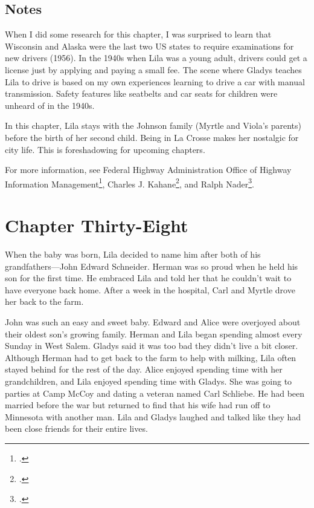 \documentclass[
  letterpaper,
]{book}
\begin{document}
\section{Notes}\label{notes-39}

When I did some research for this chapter, I was surprised to learn that
Wisconsin and Alaska were the last two US states to require examinations
for new drivers (1956). In the 1940s when Lila was a young adult,
drivers could get a license just by applying and paying a small fee. The
scene where Gladys teaches Lila to drive is based on my own experiences
learning to drive a car with manual transmission. Safety features like
seatbelts and car seats for children were unheard of in the 1940s.

In this chapter, Lila stays with the Johnson family (Myrtle and Viola's
parents) before the birth of her second child. Being in La Crosse makes
her nostalgic for city life. This is foreshadowing for upcoming
chapters.

For more information, see Federal Highway Administration Office of
Highway Information Management\footnote{.}, Charles J.
Kahane\footnote{.}, and Ralph Nader\footnote{.}.


\chapter{Chapter Thirty-Eight}\label{chapter-thirty-eight}

When the baby was born, Lila decided to name him after both of his
grandfathers---John Edward Schneider. Herman was so proud when he held
his son for the first time. He embraced Lila and told her that he
couldn't wait to have everyone back home. After a week in the hospital,
Carl and Myrtle drove her back to the farm.

John was such an easy and sweet baby. Edward and Alice were overjoyed
about their oldest son's growing family. Herman and Lila began spending
almost every Sunday in West Salem. Gladys said it was too bad they
didn't live a bit closer. Although Herman had to get back to the farm to
help with milking, Lila often stayed behind for the rest of the day.
Alice enjoyed spending time with her grandchildren, and Lila enjoyed
spending time with Gladys. She was going to parties at Camp McCoy and
dating a veteran named Carl Schliebe. He had been married before the war
but returned to find that his wife had run off to Minnesota with another
man. Lila and Gladys laughed and talked like they had been close friends
for their entire lives.
\end{document}
